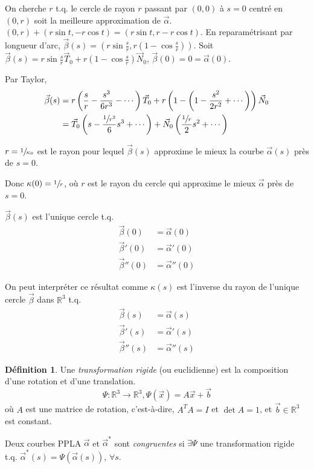\documentclass{report}
\theoremstyle{definition}
\newtheorem*{dfn}{D\'efinition}
\theoremstyle{remark}
\def\RR{\mathbb{R}}
\begin{document}
	On cherche $r$ t.q. le cercle de rayon $r$ passant par $(0,0)$ \`a $s=0$ centr\'e en $(0,r)$ soit la meilleure approximation de $\vec\alpha$. $(0,r)+(r\sin t, -r\cos t) = (r\sin t, r-r\cos t)$. En reparam\'etrisant par longueur d'arc, $\vec\beta(s) = \left( r \sin\frac{s}{r}, r\left( 1-\cos\frac{s}{r} \right) \right)$. Soit $\vec\beta(s) = r\sin\frac{s}{r}\vec T_0 + r\left( 1-\cos\frac{s}{r} \right)\vec N_0$, $\vec\beta(0)=0=\vec\alpha(0)$.

	Par Taylor,
	\begin{align*}
	\vec\beta(s)&= r\left( \frac{s}{r} - \frac{s^3}{6r^3} - \cdots \right)\vec T_0 + r\left( 1-\left( 1 - \frac{s^2}{2r^2} + \cdots \right) \right)\vec N_0\\
	&= \vec T_0\left( s-\frac{\sfrac{1}{r^2}}{6}s^3+\cdots \right) + \vec N_0 \left( \frac{\sfrac{1}{r}}{2}s^2+\cdots \right)
	\end{align*}

	$r=\sfrac{1}{\kappa_0}$ est le rayon pour lequel $\vec\beta(s)$ approxime le mieux la courbe $\vec\alpha(s)$ pr\`es de $s=0$.

	Donc $\kappa(0)=\sfrac{1}{r}$, o\`u $r$ est le rayon du cercle qui approxime le mieux $\vec\alpha$ pr\`es de $s=0$.

	$\vec\beta(s)$ est l'unique cercle t.q.
	\begin{align*}
	\vec\beta(0)&= \vec\alpha(0)\\
	\vec\beta'(0)&= \vec\alpha'(0)\\
	\vec\beta''(0)&= \vec\alpha''(0)
	\end{align*}

	On peut interpr\'eter ce r\'esultat comme $\kappa(s)$ est l'inverse du rayon de l'unique cercle $\vec\beta$ dans $\RR^3$ t.q.
	\begin{align*}
	\vec\beta(s)&= \vec\alpha(s)\\
	\vec\beta'(s)&= \vec\alpha'(s)\\
	\vec\beta''(s)&= \vec\alpha''(s)
	\end{align*}

	\begin{dfn}
		Une \emph{transformation rigide} (ou euclidienne) est la composition d'une rotation et d'une translation. \[ \Psi : \RR^3\to\RR^3, \Psi(\vec x) = A\vec x+\vec b \] o\`u $A$ est une matrice de rotation, c'est-\`a-dire, $A^TA=I$ et $\det A=1$, et $\vec b\in\RR^3$ est constant.

		Deux courbes PPLA $\vec\alpha$ et $\vec\alpha^*$ sont \emph{congruentes} si $\exists \Psi$ une transformation rigide t.q. $\vec\alpha^*(s)=\Psi(\vec\alpha(s))$, $\forall s$.
	\end{dfn}
\end{document}
